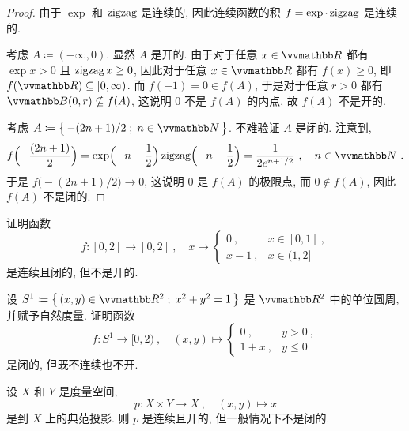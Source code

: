 \begin{proof}
    由于 \(\exp\) 和 \(\operatorname{zigzag}\) 是连续的, 因此连续函数的积 \(f = \exp \cdot \operatorname{zigzag}\) 是连续的.

    考虑 \(A \coloneqq (- \infty, 0)\). 显然 \(A\) 是开的. 由于对于任意 \(x \in \R\) 都有 \(\exp x > 0\) 且 \(\operatorname{zigzag} x \geq 0\), 因此对于任意 \(x \in \R\) 都有 \(f(x) \geq 0\), 即 \(f(\R) \subseteq [0, \infty)\). 而 \(f(- 1) = 0 \in f(A)\), 于是对于任意 \(r > 0\) 都有 \(\B(0, r) \nsubseteq f(A)\), 这说明 \(0\) 不是 \(f(A)\) 的内点, 故 \(f(A)\) 不是开的.

    考虑 \(A \coloneqq \bigl\{\, - (2 n + 1) / 2 \;;\; n \in \N \,\bigr\}\). 不难验证 \(A\) 是闭的. 注意到,
    \[
        f\Bigl(- \frac{(2 n + 1)}{2}\Bigr) = \exp\Bigl(- n - \frac{1}{2}\Bigr) \zigzag\Bigl(- n - \frac{1}{2}\Bigr) = \frac{1}{2 e^{n + 1 / 2}}\ ,\quad n \in \N\ .
    \]
    于是 \(f\bigl(- (2 n + 1) / 2\bigr) \to 0\), 这说明 \(0\) 是 \(f(A)\) 的极限点, 而 \(0 \notin f(A)\), 因此 \(f(A)\) 不是闭的.
\end{proof}

\begin{exercise}
    证明函数
    \[
        f \colon [0, 2] \to [0, 2]\ ,\quad x \mapsto
        \begin{cases}
            0\ ,     & x \in [0, 1]\ , \\
            x - 1\ , & x \in (1, 2]
        \end{cases}
    \]
    是连续且闭的, 但不是开的.
\end{exercise}

\begin{exercise}
    设 \(S^1 \coloneqq \bigl\{\, (x, y) \in \R^2 \;;\; x^2 + y^2 = 1 \,\bigr\}\) 是 \(\R^2\) 中的单位圆周, 并赋予自然度量. 证明函数
    \[
        f \colon S^1 \to [0, 2)\ ,\quad (x, y) \mapsto
        \begin{cases}
            0\ ,     & y > 0\ , \\
            1 + x\ , & y \leq 0
        \end{cases}
    \]
    是闭的, 但既不连续也不开.
\end{exercise}

\begin{exercise}
    设 \(X\) 和 \(Y\) 是度量空间,
    \[
        p \colon X \times Y \to X\ ,\quad (x, y) \mapsto x
    \]
    是到 \(X\) 上的典范投影. 则 \(p\) 是连续且开的, 但一般情况下不是闭的.
\end{exercise}

